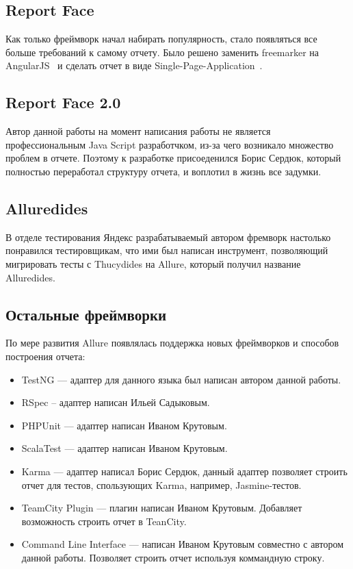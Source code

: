 \subsection{Report Face}

Как только фреймворк начал набирать популярность, стало появляться все больше требований к самому отчету. Было решено заменить freemarker на AngularJS~\cite{angularjs_home} и сделать отчет в виде Single-Page-Application~\cite{spa}. 

\subsection{Report Face 2.0}

Автор данной работы на момент написания работы не является профессиональным Java Script разработчком, из-за чего возникало множество проблем в отчете. Поэтому к разработке присоеденился Борис Сердюк, который полностью переработал структуру отчета, и воплотил в жизнь все задумки.

\subsection{Alluredides}

В отделе тестирования Яндекс разрабатываемый автором фремворк настолько понравился тестировщикам, что ими был написан инструмент, позволяющий мигрировать тесты с Thucydides на Allure, который получил название Alluredides.

\subsection{Остальные фреймворки}

По мере развития Allure появлялась поддержка новых фреймворков и способов построения отчета:

\begin{itemize}
\item TestNG --- адаптер для данного языка был написан автором данной работы.
\item RSpec -- адаптер написан Ильей Садыковым.
\item PHPUnit --- адаптер написан Иваном Крутовым.
\item ScalaTest --- адаптер написан Иваном Крутовым.
\item Karma --- адаптер написал Борис Сердюк, данный адаптер позволяет строить отчет для тестов, спользующих Karma, например, Jasmine-тестов.
\item TeamCity Plugin --- плагин написан Иваном Крутовым. Добавляет возможность строить отчет в TeanCity.
\item Command Line Interface --- написан Иваном Крутовым совместно с автором данной работы. Позволяет строить отчет используя коммандную строку.
\end{itemize}

